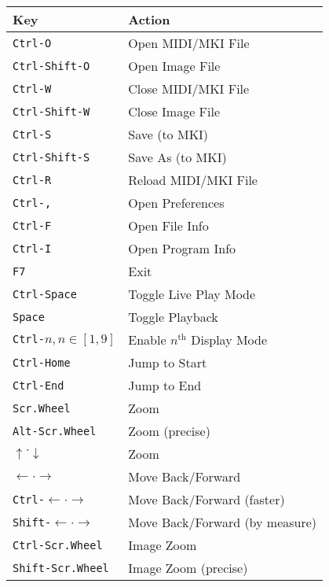 \documentclass[english]{article}
\makeatletter
\newenvironment{restoretext}%
    {\@parboxrestore%
     \begin{adjustwidth}{}{\leftmargin}%
    }{\end{adjustwidth}
     }
\def\rcbegin{\begin{restoretext}\centering}
\def\rcend{\end{restoretext}}
\providecommand{\mi}[1]{\texttt{#1}}
\makeatother
\begin{document}
\rcbegin
\begin{tabular}{|l|l|}
  \hline
  \textbf{Key}                 														& \textbf{Action} \\
  \hline
  \mi{Ctrl-O}       					 														& Open MIDI/MKI File \\
  \mi{Ctrl-Shift-O} 					 														& Open Image File \\
  \mi{Ctrl-W}       					 														& Close MIDI/MKI File \\
  \mi{Ctrl-Shift-W} 					 														& Close Image File \\
  \mi{Ctrl-S}       					 														& Save (to MKI) \\
  \mi{Ctrl-Shift-S} 					 														& Save As (to MKI) \\
  \mi{Ctrl-R}       					 														& Reload MIDI/MKI File \\
  \mi{Ctrl-,}       					 														& Open Preferences \\
  \mi{Ctrl-F}       					 														& Open File Info \\
  \mi{Ctrl-I}       					 														& Open Program Info \\
  \mi{F7}       					     														& Exit \\
  \mi{Ctrl-Space}   					 														& Toggle Live Play Mode \\
  \mi{Space}   					 														      & Toggle Playback \\
  \mi{Ctrl-}$n, n \in [1,9]$   														& Enable $n^\text{th}$ Display Mode\\
  \mi{Ctrl-Home}   					 														  & Jump to Start \\
  \mi{Ctrl-End}   					 														  & Jump to End \\
  \mi{Scr.Wheel}       			 										  				& Zoom \\
  \mi{Alt-Scr.Wheel}       			 										  		& Zoom (precise) \\
  $\uparrow \cdot \downarrow$       			                & Zoom \\
  $\leftarrow \cdot \rightarrow$       			              & Move Back/Forward \\
  \mi{Ctrl-}$\leftarrow \cdot \rightarrow$       			    & Move Back/Forward (faster) \\
  \mi{Shift-}$\leftarrow \cdot \rightarrow$       			  & Move Back/Forward (by measure) \\
  \mi{Ctrl-Scr.Wheel}       			 										  	& Image Zoom \\
  \mi{Shift-Scr.Wheel}       			 										  	& Image Zoom (precise) \\
  \hline
\end{tabular}
\rcend
\end{document}

